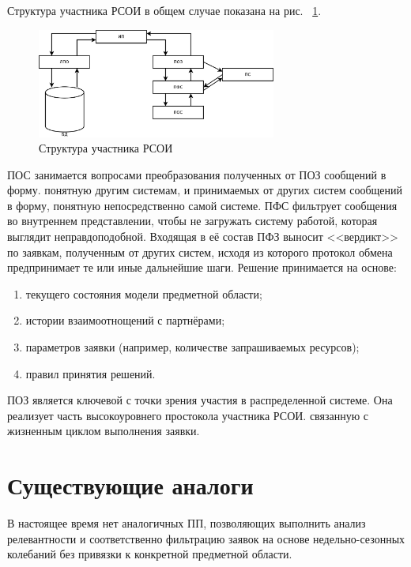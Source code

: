 \documentclass[utf8x, 12pt]{G7-32}
\begin{document}
Структура участника РСОИ в общем случае показана на рис. ~\ref{fig:participant}. 
\begin{figure}[ht]
        \centering
        \includegraphics[width=0.7\textwidth]{inc/dia/rpz-participant}
        \caption{Структура участника РСОИ}
        \label{fig:participant}
\end{figure}
ПОС занимается вопросами преобразования полученных от ПОЗ сообщений в форму.
понятную другим системам, и принимаемых от других систем сообщений в форму,
понятную непосредственно самой системе. ПФС фильтрует сообщения во внутреннем 
представлении, чтобы не загружать систему работой, которая выглядит 
неправдоподобной. Входящая в её состав ПФЗ выносит <<вердикт>> по заявкам, 
полученным от других систем, исходя из которого протокол обмена предпринимает те или 
иные дальнейшие шаги. Решение принимается на основе:
\begin{enumerate}
        \item текущего состояния модели предметной области;
        \item истории взаимоотнощений с партнёрами;
        \item параметров заявки (например, количестве запрашиваемых ресурсов);
        \item правил принятия решений.
\end{enumerate}
ПОЗ является ключевой с точки зрения участия в распределенной системе. Она 
реализует часть высокоуровнего простокола участника РСОИ. связанную с жизненным 
циклом выполнения заявки.

\section{Существующие аналоги}
В настоящее время нет аналогичных ПП, позволяющих выполнить анализ релевантности
и соответственно фильтрацию заявок на основе недельно-сезонных колебаний без 
привязки к конкретной предметной области.
\end{document}
